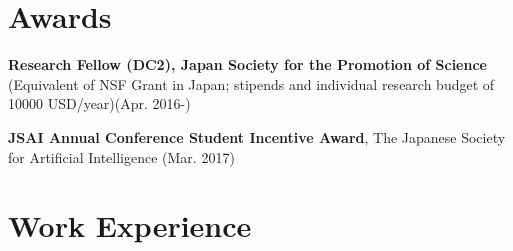 \documentclass[letterpaper,11pt]{article}
\begin{document}
\section{Awards}

\textbf{Research Fellow (DC2), Japan Society for the Promotion of Science} (Equivalent of NSF Grant in Japan; stipends and individual research budget of 10000 USD/year)(Apr. 2016-)

\textbf{JSAI Annual Conference Student Incentive Award}, The Japanese Society for Artificial Intelligence (Mar. 2017)


\section{Work Experience}
\end{document}

